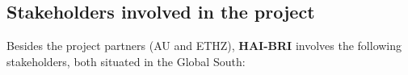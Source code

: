 \documentclass[12pt,a4paper]{article}
\newcommand{\projectname}{\textbf{HAI-BRI }} %
\newif\iftemplatenotes
\newcommand{\lengthnote}[1]{%
  \iftemplatenotes
    {\small\itshape\color{gray!70!black} [Target length: #1]}\par\vspace{4pt}
  \fi
}
\begin{document}
\subsection{Stakeholders involved in the project}
%
\justifying
\setlength{\parindent}{0pt}
\setlength{\parskip}{0.8em}
Besides the project partners (AU and ETHZ), \projectname involves the following stakeholders, both situated in the Global South:
\end{document}
